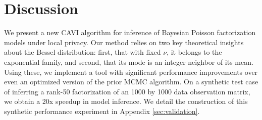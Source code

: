 \documentclass[letterpaper]{article}
\newcommand{\Bess}[1]{\textup{Bessel}\left( #1 \right)}
\begin{document}
  
  
  
  
  \section{Discussion}
  We present a new CAVI algorithm for inference of Bayesian Poisson
  factorization models under local privacy. Our method relies on two key
  theoretical insights about the Bessel distribution: first, that with fixed
  $\nu$, it belongs to the exponential family, and second, that its mode is an
  integer neighbor of its mean. Using these, we implement a tool with
  significant performance improvements over even an optimized version of the
  prior MCMC algorithm. On a synthetic test case of inferring a rank-50
  factorization of an 1000 by 1000 data observation matrix, we obtain a 20x
  speedup in model inference. We detail the construction of this synthetic
  performance experiment in Appendix \ref{sec:validation}.
  
  
  
  
  \appendix
  
\end{document}
